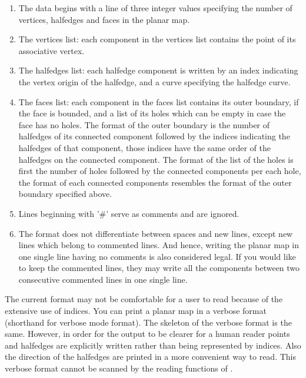 \begin{ccAdvanced}
\begin{enumerate}

\item The data begins with a line of three integer values specifying
the number of vertices, halfedges and faces in the planar map.
\item The vertices list: each component in the vertices list contains
the point of its associative vertex. 
\item The halfedges list: each halfedge component is written by an
index indicating the vertex origin of the halfedge, and a curve
specifying the halfedge curve.
\item The faces list: each component in the faces list contains its
outer boundary, if the face is bounded, and a list of its holes which
can be empty in case the face has no holes. The format of the outer
boundary is the number of halfedges of its connected component
followed by the indices indicating the halfedges of that component,
those indices have the same order of the halfedges on the connected
component. The format of the list of the holes is first the number of
holes followed by the connected components per each hole, the format
of each connected components resembles the format of the outer
boundary specified above.
\item Lines beginning with '\#' serve as comments and are ignored.
\item The format does not differentiate between spaces and new lines, 
except new lines which belong to commented lines. 
And hence, writing the planar map in one single line having no comments is
also considered legal. If you would like to keep the commented
lines, they may write all the components between two consecutive
commented lines in one single line.

\end{enumerate}

The current format may not be comfortable for a user to read because
of the extensive use of indices. You can print a planar map in a
verbose format (shorthand for verbose mode format).  The skeleton of 
the verbose format is the same. However, in order for the output to be
clearer for a human reader points and halfedges are explicitly written
rather than being represented by indices. Also the direction of the
halfedges are printed in a more convenient way to read. This verbose
format cannot be scanned by the reading functions of
.

\ccExample


\end{ccAdvanced}
